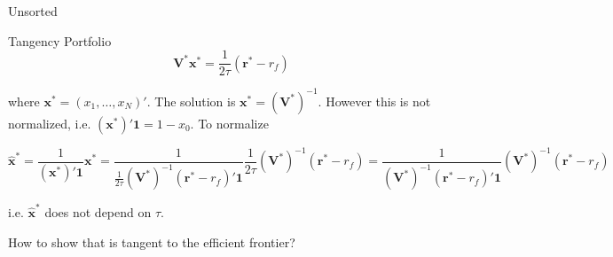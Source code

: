 \documentclass{article}
\begin{document}
\begin{section}{Unsorted}
\begin{subsection}{Tangency Portfolio}
\[ \mathbf{V}^* \mathbf{x}^* = \frac{1}{2 \tau} (\mathbf{r}^* - r_f) \]

\noindent where $\mathbf{x}^* = (x_1, \dots, x_N)'$. The solution is
$\mathbf{x}^* = (\mathbf{V}^*)^{-1}$. However this is not normalized, i.e. 
$(\mathbf{x}^*)' \mathbf{1} = 1 - x_0$. To normalize

\[ \mathbf{\hat{x}}^* = \frac{1}{(\mathbf{x}^*)' \mathbf{1}} \mathbf{x}^* =
    \frac{1}{\frac{1}{2 \tau} (\mathbf{V}^*)^{-1} (\mathbf{r}^* - r_f)' \mathbf{1}}
     \frac{1}{2 \tau} (\mathbf{V}^*)^{-1} (\mathbf{r}^* - r_f) =
    \frac{1}{(\mathbf{V}^*)^{-1} (\mathbf{r}^* - r_f)' \mathbf{1}}
      (\mathbf{V}^*)^{-1} (\mathbf{r}^* - r_f) \]

\noindent i.e. $\mathbf{\hat{x}}^*$ does not depend on $\tau$.

How to show that is tangent to the efficient frontier?


\end{subsection}
\end{section}
\end{document}
